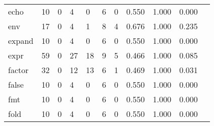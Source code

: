\begin{longtable}{lp{1.10cm}p{1.10cm}p{1.10cm}p{1.10cm}p{1.10cm}p{1.10cm}p{1.10cm}p{1.10cm}p{1.10cm}p{1.10cm}}
echo      &                     10 &                                  0 &                                 4 &                                0 &                                 6 &                               0 &                          0.550 &                                 1.000 &                               0.000 \\
env       &                     17 &                                  0 &                                 4 &                                1 &                                 8 &                               4 &                          0.676 &                                 1.000 &                               0.235 \\
expand    &                     10 &                                  0 &                                 4 &                                0 &                                 6 &                               0 &                          0.550 &                                 1.000 &                               0.000 \\
expr      &                     59 &                                  0 &                                27 &                               18 &                                 9 &                               5 &                          0.466 &                                 1.000 &                               0.085 \\
factor    &                     32 &                                  0 &                                12 &                               13 &                                 6 &                               1 &                          0.469 &                                 1.000 &                               0.031 \\
false     &                     10 &                                  0 &                                 4 &                                0 &                                 6 &                               0 &                          0.550 &                                 1.000 &                               0.000 \\
fmt       &                     10 &                                  0 &                                 4 &                                0 &                                 6 &                               0 &                          0.550 &                                 1.000 &                               0.000 \\
fold      &                     10 &                                  0 &                                 4 &                                0 &                                 6 &                               0 &                          0.550 &                                 1.000 &                               0.000 \\

\end{longtable}

